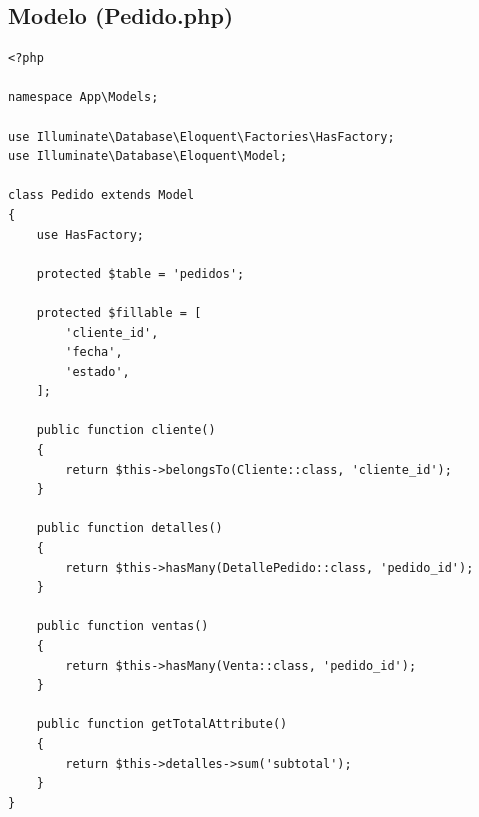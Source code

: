 \documentclass[12pt, letterpaper]{article}
\begin{document}
\subsection{Modelo (Pedido.php)}
\begin{lstlisting}[language=purePHP]
<?php

namespace App\Models;

use Illuminate\Database\Eloquent\Factories\HasFactory;
use Illuminate\Database\Eloquent\Model;

class Pedido extends Model
{
    use HasFactory;

    protected $table = 'pedidos';

    protected $fillable = [
        'cliente_id',
        'fecha',
        'estado',
    ];

    public function cliente()
    {
        return $this->belongsTo(Cliente::class, 'cliente_id');
    }

    public function detalles()
    {
        return $this->hasMany(DetallePedido::class, 'pedido_id');
    }

    public function ventas()
    {
        return $this->hasMany(Venta::class, 'pedido_id');
    }

    public function getTotalAttribute()
    {
        return $this->detalles->sum('subtotal');
    }
}
\end{lstlisting}
\end{document}

